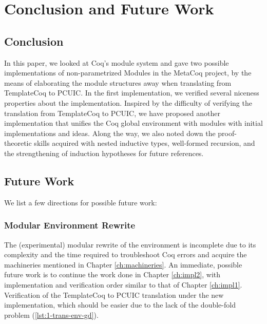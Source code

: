 \chapter{Conclusion and Future Work}
\label{ch:future}

\section{Conclusion}
In this paper, we looked at Coq's module system and gave two possible
implementations of non-parametrized Modules in the MetaCoq project, by the means
of elaborating the module structures away when translating from TemplateCoq to
PCUIC. In the first implementation, we verified several niceness properties
about the implementation. Inspired by the difficulty of verifying the
translation from TemplateCoq to PCUIC, we have proposed another implementation
that unifies the Coq global environment with modules with initial
implementations and ideas. Along the way, we also noted down the proof-theoretic
skills acquired with nested inductive types, well-formed recursion, and the
strengthening of induction hypotheses for future references.


\section{Future Work}
We list a few directions for possible future work:

\subsection{Modular Environment Rewrite}
\label{subsec:modular-env}
The (experimental) modular rewrite of the environment is incomplete due to its
complexity and the time required to troubleshoot Coq errors and acquire the
machineries mentioned in Chapter \ref{ch:machineries}. An immediate, possible
future work is to continue the work done in Chapter \ref{ch:impl2}, with
implementation and verification order similar to that of Chapter \ref{ch:impl1}.
Verification of the TemplateCoq to PCUIC translation under the new
implementation, which should be easier due to the lack of the double-fold
problem (\ref{lst:1-trans-env-gd}).


